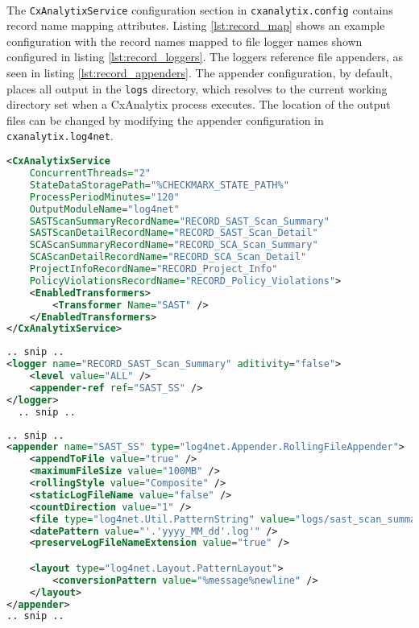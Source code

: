 \noindent\\The \texttt{CxAnalytixService} configuration section in \texttt{cxanalytix.config} contains record name mapping attributes.  Listing \ref{lst:record_map}
shows an example configuration with the record names mapped to file logger names shown configured in listing \ref{lst:record_loggers}.  The loggers
reference file appenders, as seen in listing \ref{lst:record_appenders}.  The appender configuration, by default, places all output in the \texttt{logs}
directory, which resolves to the current working directory set when a CxAnalytix process executes.  The location of the output files can be changed
by modifying the appender configuration in \texttt{cxanalytix.log4net}.


\begin{lstlisting}[caption={Example Record Map Configuration}, label={lst:record_map}, language=XML]
<CxAnalytixService 
    ConcurrentThreads="2" 
    StateDataStoragePath="%CHECKMARX_STATE_PATH%"
    ProcessPeriodMinutes="120"
    OutputModuleName="log4net"
    SASTScanSummaryRecordName="RECORD_SAST_Scan_Summary"
    SASTScanDetailRecordName="RECORD_SAST_Scan_Detail"
    SCAScanSummaryRecordName="RECORD_SCA_Scan_Summary"
    SCAScanDetailRecordName="RECORD_SCA_Scan_Detail"
    ProjectInfoRecordName="RECORD_Project_Info"
    PolicyViolationsRecordName="RECORD_Policy_Violations">
    <EnabledTransformers>
        <Transformer Name="SAST" />
    </EnabledTransformers>
</CxAnalytixService>
\end{lstlisting}

\begin{lstlisting}[caption={Log4Net Logger Configurations}, label={lst:record_loggers}, language=XML]
.. snip ..
<logger name="RECORD_SAST_Scan_Summary" aditivity="false">
    <level value="ALL" />
    <appender-ref ref="SAST_SS" />
</logger>
  .. snip ..
\end{lstlisting}

\begin{lstlisting}[caption={Log4Net Record File Appenders}, label={lst:record_appenders}, language=XML]
.. snip ..
<appender name="SAST_SS" type="log4net.Appender.RollingFileAppender">
    <appendToFile value="true" />
    <maximumFileSize value="100MB" />
    <rollingStyle value="Composite" />
    <staticLogFileName value="false" />
    <countDirection value="1" />
    <file type="log4net.Util.PatternString" value="logs/sast_scan_summary" />
    <datePattern value="'.'yyyy_MM_dd'.log'" />
    <preserveLogFileNameExtension value="true" />

    <layout type="log4net.Layout.PatternLayout">
        <conversionPattern value="%message%newline" />
    </layout>
</appender>
.. snip ..
\end{lstlisting}


